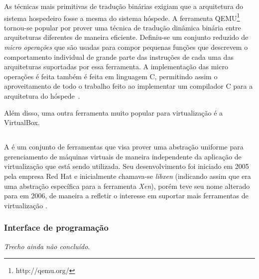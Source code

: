 As técnicas mais primitivas de tradução binárias exigiam que a arquitetura
do sistema hospedeiro fosse a mesma do sistema hóspede. A ferramenta
QEMU\footnote{http://qemu.org/} tornou-se popular por prover uma técnica de
tradução dinâmica binária entre arquiteturas diferentes de maneira
eficiente. Definiu-se um conjunto reduzido de \emph{micro operações} que
são usadas para compor pequenas funções que descrevem o comportamento
individual de grande parte das instruções de cada uma das arquiteturas
suportadas por essa ferramenta. A implementação das micro operações é feita
também é feita em linguagem C, permitindo assim o aproveitamento de todo o
trabalho feito ao implementar um compilador C para a arquitetura do
hóspede~\cite{bellard2005qemu}.

Além disso, uma outra ferramenta muito popular para virtualização é a
VirtualBox.




\subsection{\libvirt}\label{sec:libvirt}


A \libvirt{} é um conjunto de ferramentas que visa prover uma abstração
uniforme para gerenciamento de máquinas virtuais de maneira independente
da aplicação de virtualização que está sendo utilizada. Seu desenvolvimento
foi iniciado em 2005 pela empresa Red Hat e inicialmente chamava-se
\emph{libxen} (indicando assim que era uma abstração específica para a
ferramenta \emph{Xen}), porém teve seu nome alterado para \libvirt{} em
2006, de maneira a refletir o interesse em suportar mais ferramentas de
virtualização .

\subsubsection{Interface de programação}\label{sec:libvirtapi}

\emph{Trecho ainda não concluído}.
